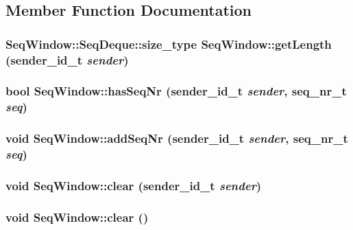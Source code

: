 \subsection{Member Function Documentation}
\subsubsection{\setlength{\rightskip}{0pt plus 5cm}Seq\-Window::Seq\-Deque::size\_\-type Seq\-Window::get\-Length ({\bf sender\_\-id\_\-t} {\em sender})}\label{classSeqWindow_5d39959927c79c54d133ed77b297ad7c}


\subsubsection{\setlength{\rightskip}{0pt plus 5cm}bool Seq\-Window::has\-Seq\-Nr ({\bf sender\_\-id\_\-t} {\em sender}, {\bf seq\_\-nr\_\-t} {\em seq})}\label{classSeqWindow_9e7714dda181863420c38975bd505aff}


\subsubsection{\setlength{\rightskip}{0pt plus 5cm}void Seq\-Window::add\-Seq\-Nr ({\bf sender\_\-id\_\-t} {\em sender}, {\bf seq\_\-nr\_\-t} {\em seq})}\label{classSeqWindow_255ca0fca3e701bd9e18d9fcb2c022a2}


\subsubsection{\setlength{\rightskip}{0pt plus 5cm}void Seq\-Window::clear ({\bf sender\_\-id\_\-t} {\em sender})}\label{classSeqWindow_e9774163b8f7ac0ec081d1ba5b2daed2}


\subsubsection{\setlength{\rightskip}{0pt plus 5cm}void Seq\-Window::clear ()}\label{classSeqWindow_b1a03fe152c7c94ff3f05005d595b424}


